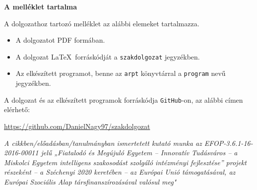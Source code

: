 \pagestyle{empty}

\noindent \textbf{\Large A melléklet tartalma}

\vskip 1cm

\noindent A dolgozathoz tartozó melléklet az alábbi elemeket tartalmazza.
\begin{itemize}
\item A dolgozatot PDF formában.
\item A dolgozat \LaTeX\ forráskódját a \texttt{szakdolgozat} jegyzékben.
\item Az elkészített programot, benne az \texttt{arpt} könyvtárral a \texttt{program} nevű jegyzékben.
\end{itemize}

\bigskip

\noindent A dolgozat és az elkészített programok forráskódja \texttt{GitHub}-on, az alábbi címen elérhető:

\bigskip

\quad \url{https://github.com/DanielNagy97/szakdolgozat}

\pagebreak

\emph{A cikkben/előadásban/tanulmányban ismertetett kutató munka az
EFOP-3.6.1-16-2016-00011 jelű „Fiatalodó és Megújuló Egyetem –
Innovatív Tudásváros – a Miskolci Egyetem intelligens szakosodást
szolgáló intézményi fejlesztése” projekt részeként – a
Széchenyi 2020 keretében – az Európai Unió támogatásával, az
Európai Szociális Alap társfinanszírozásával valósul meg"}
